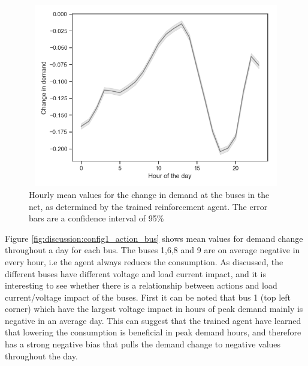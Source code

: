 \documentclass[class=book, crop=false]{standalone}
\begin{document}
\begin{figure}[h]
    \center
\includegraphics[height=8cm, width=12cm]{figures/config1_action_hour.png}
    \caption[size = 9]{Hourly mean values for the change in demand at the buses in the net, as determined by the trained reinforcement agent. The error bars are a confidence interval of 95\%}
    \label{fig:discussion:config1_action_hour}
\end{figure}

Figure \ref{fig:discussion:config1_action_bus} shows mean values for demand change throughout a day for each bus.  The buses 1,6,8 and 9 are on average negative in every hour, i.e the agent always reduces the consumption. As discussed, the different buses have different voltage and load current impact, and it is interesting to see whether there is a relationship between actions and load current/voltage impact of the buses. First it can be noted that bus 1 (top left corner) which have the largest voltage impact in hours of peak demand mainly is negative in an average day. This can suggest that the trained agent have learned that lowering the consumption is beneficial in peak demand hours, and therefore has a strong negative bias that pulls the demand change to negative values throughout the day. 
\end{document}
